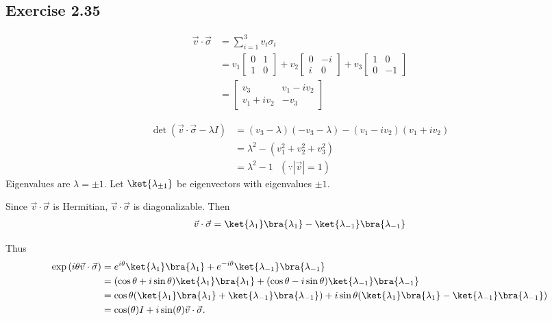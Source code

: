 \documentclass[a4paper,12pt]{article}
\begin{document}
\subsection*{Exercise 2.35}
\begin{align*}
	\vec{v} \cdot \vec{\sigma} &= \sum_{i=1}^3 v_i \sigma_i\\
		&= v_1 \begin{bmatrix}
		0 & 1 \\
		1 & 0
		\end{bmatrix}
		+ v_2 \begin{bmatrix}
		0 & -i \\
		i & 0
		\end{bmatrix}
		+ v_3 \begin{bmatrix}
		1 & 0 \\
		0 & -1
		\end{bmatrix} \\
		&= \begin{bmatrix}
		v_3 & v_1 - i v_2 \\
		v_1 + iv_2 & -v_3
		\end{bmatrix}
\end{align*}

\begin{align*}
	\det (\vec{v} \cdot \vec{\sigma}  - \lambda I) &= (v_3 - \lambda) (-v_3 - \lambda) - (v_1 - iv_2) (v_1 + iv_2)\\
			&= \lambda^2 - (v_1^2 + v_2^2  + v_3^2)\\
			&= \lambda^2 - 1 ~~~ (\because |\vec{v}| = 1)
\end{align*}
Eigenvalues are $\lambda = \pm 1$.
Let $\ket{\lambda_{ \pm 1 } }$ be eigenvectors with eigenvalues $\pm  1$.

Since $\vec{v} \cdot \vec{\sigma}$ is Hermitian,  $\vec{v} \cdot \vec{\sigma}$ is diagonalizable.
Then
\begin{align*}
	\vec{v} \cdot \vec{\sigma} = \ket{\lambda_1}\bra{\lambda_1} - \ket{\lambda_{-1}}\bra{\lambda_{-1}}
\end{align*}

Thus
\begin{align*}
	\exp \left(i \theta \vec{v} \cdot \vec{\sigma} \right) &=
	e^{i \theta} \ket{\lambda_1}\bra{\lambda_1}  + e^{-i \theta} \ket{\lambda_{-1}}\bra{\lambda_{-1}}\\
	&= (\cos \theta + i \sin \theta) \ket{\lambda_1}\bra{\lambda_1} + (\cos \theta - i \sin \theta) \ket{\lambda_{-1}}\bra{\lambda_{-1}}\\
	&= \cos \theta (\ket{\lambda_1}\bra{\lambda_1} + \ket{\lambda_{-1}}\bra{\lambda_{-1}}) + i \sin \theta (\ket{\lambda_1}\bra{\lambda_1} - \ket{\lambda_{-1}}\bra{\lambda_{-1}}) \\
	&= \cos( \theta) I + i \sin (\theta) \vec{v} \cdot \vec{\sigma}.
\end{align*}
\end{document}
